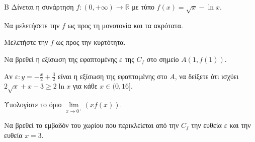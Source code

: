 \begin{thema}{Β}
Δίνεται η συνάρτηση $f:(0,+\infty)\to\mathbb{R}$ με τύπο $f(x)=\sqrt{x}-\ln{x}$.
\begin{erwthma}
\item Να μελετήσετε την $f$ ως προς τη μονοτονία και τα ακρότατα.
\item Μελετήστε την $f$ ως προς την κυρτότητα.
\item Να βρεθεί η εξίσωση της εφαπτομένης $\varepsilon$ της $C_f$ στο σημείο $A(1,f(1))$.
\item Αν $\varepsilon: y=-\frac{x}{2}+\frac{3}{2}$ είναι η εξίσωση της εφαπτομένης στο $A$, να δείξετε ότι ισχύει $2\sqrt{x}+x-3\geq 2\ln{x}$ για κάθε $x\in(0,16]$.
\item Υπολογίστε το όριο $\lim\limits_{x\to0^+}{(xf(x))}$.
\item Να βρεθεί το εμβαδόν του χωρίου που περικλείεται από την $C_f$ την ευθεία $\varepsilon$ και την ευθεία $x=3$.
\end{erwthma}
\end{thema}

